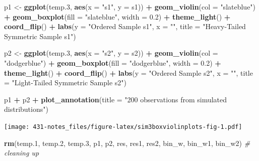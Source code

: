 \documentclass[
]{book}
\newenvironment{Shaded}{\begin{snugshade}}{\end{snugshade}}
\newcommand{\CommentTok}[1]{\textcolor[rgb]{0.56,0.35,0.01}{\textit{#1}}}
\newcommand{\DataTypeTok}[1]{\textcolor[rgb]{0.13,0.29,0.53}{#1}}
\newcommand{\FloatTok}[1]{\textcolor[rgb]{0.00,0.00,0.81}{#1}}
\newcommand{\KeywordTok}[1]{\textcolor[rgb]{0.13,0.29,0.53}{\textbf{#1}}}
\newcommand{\NormalTok}[1]{#1}
\newcommand{\OperatorTok}[1]{\textcolor[rgb]{0.81,0.36,0.00}{\textbf{#1}}}
\newcommand{\StringTok}[1]{\textcolor[rgb]{0.31,0.60,0.02}{#1}}
\begin{document}
\begin{Shaded}
\begin{Highlighting}[]
\NormalTok{p1 <-}\StringTok{ }\KeywordTok{ggplot}\NormalTok{(temp}\FloatTok{.3}\NormalTok{, }\KeywordTok{aes}\NormalTok{(}\DataTypeTok{x =} \StringTok{"s1"}\NormalTok{, }\DataTypeTok{y =}\NormalTok{ s1)) }\OperatorTok{+}
\StringTok{    }\KeywordTok{geom_violin}\NormalTok{(}\DataTypeTok{col =} \StringTok{"slateblue"}\NormalTok{) }\OperatorTok{+}\StringTok{ }
\StringTok{    }\KeywordTok{geom_boxplot}\NormalTok{(}\DataTypeTok{fill =} \StringTok{"slateblue"}\NormalTok{, }\DataTypeTok{width =} \FloatTok{0.2}\NormalTok{) }\OperatorTok{+}
\StringTok{    }\KeywordTok{theme_light}\NormalTok{() }\OperatorTok{+}
\StringTok{    }\KeywordTok{coord_flip}\NormalTok{() }\OperatorTok{+}
\StringTok{    }\KeywordTok{labs}\NormalTok{(}\DataTypeTok{y =} \StringTok{"Ordered Sample s1"}\NormalTok{, }\DataTypeTok{x =} \StringTok{""}\NormalTok{,}
         \DataTypeTok{title =} \StringTok{"Heavy-Tailed Symmetric Sample s1"}\NormalTok{)}

\NormalTok{p2 <-}\StringTok{ }\KeywordTok{ggplot}\NormalTok{(temp}\FloatTok{.3}\NormalTok{, }\KeywordTok{aes}\NormalTok{(}\DataTypeTok{x =} \StringTok{"s2"}\NormalTok{, }\DataTypeTok{y =}\NormalTok{ s2)) }\OperatorTok{+}
\StringTok{    }\KeywordTok{geom_violin}\NormalTok{(}\DataTypeTok{col =} \StringTok{"dodgerblue"}\NormalTok{) }\OperatorTok{+}\StringTok{ }
\StringTok{    }\KeywordTok{geom_boxplot}\NormalTok{(}\DataTypeTok{fill =} \StringTok{"dodgerblue"}\NormalTok{, }\DataTypeTok{width =} \FloatTok{0.2}\NormalTok{) }\OperatorTok{+}
\StringTok{    }\KeywordTok{theme_light}\NormalTok{() }\OperatorTok{+}
\StringTok{    }\KeywordTok{coord_flip}\NormalTok{() }\OperatorTok{+}
\StringTok{    }\KeywordTok{labs}\NormalTok{(}\DataTypeTok{y =} \StringTok{"Ordered Sample s2"}\NormalTok{, }\DataTypeTok{x =} \StringTok{""}\NormalTok{,}
         \DataTypeTok{title =} \StringTok{"Light-Tailed Symmetric Sample s2"}\NormalTok{)}

\NormalTok{p1 }\OperatorTok{+}\StringTok{ }\NormalTok{p2 }\OperatorTok{+}\StringTok{ }\KeywordTok{plot_annotation}\NormalTok{(}\DataTypeTok{title =} \StringTok{"200 observations from simulated distributions"}\NormalTok{)}
\end{Highlighting}
\end{Shaded}

\texttt{[image: 431-notes\_files/figure-latex/sim3boxviolinplots-fig-1.pdf]}

\begin{Shaded}
\begin{Highlighting}[]
\KeywordTok{rm}\NormalTok{(temp}\FloatTok{.1}\NormalTok{, temp}\FloatTok{.2}\NormalTok{, temp}\FloatTok{.3}\NormalTok{, p1, p2, res, res1, res2, bin_w, bin_w1, bin_w2) }\CommentTok{# cleaning up}
\end{Highlighting}
\end{Shaded}
\end{document}
